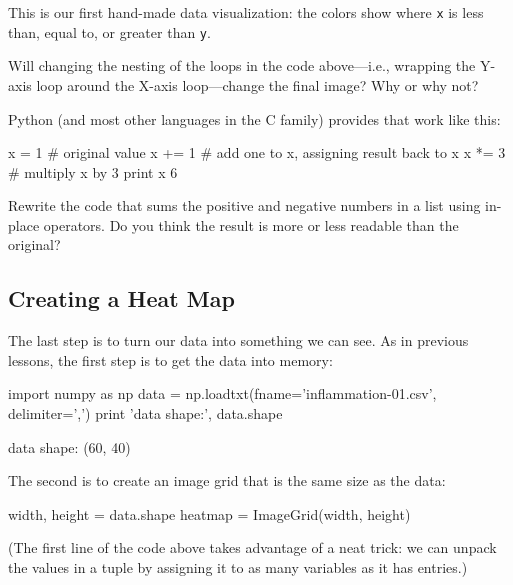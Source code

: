 
This is our first hand-made data visualization: the colors show where
\texttt{x} is less than, equal to, or greater than \texttt{y}.

\begin{challenge}
  Will changing the nesting of the loops in the code above---i.e.,
  wrapping the Y-axis loop around the X-axis loop---change the final
  image? Why or why not?
\end{challenge}

\begin{challenge}
  Python (and most other languages in the C family) provides
   that work like
  this:

\begin{VerbIn}
x = 1  # original value
x += 1 # add one to x, assigning result back to x
x *= 3 # multiply x by 3
print x
6
\end{VerbIn}

  Rewrite the code that sums the positive and negative numbers in a list
  using in-place operators. Do you think the result is more or less
  readable than the original?
\end{challenge}

\subsection{Creating a Heat Map}

The last step is to turn our data into something we can see. As in
previous lessons, the first step is to get the data into memory:

\begin{VerbIn}
import numpy as np
data = np.loadtxt(fname='inflammation-01.csv', delimiter=',')
print 'data shape:', data.shape
\end{VerbIn}

\begin{VerbOut}
data shape: (60, 40)
\end{VerbOut}

The second is to create an image grid that is the same size as the data:

\begin{VerbIn}
width, height = data.shape
heatmap = ImageGrid(width, height)
\end{VerbIn}

(The first line of the code above takes advantage of a neat trick: we
can unpack the values in a tuple by assigning it to as many variables as
it has entries.)

